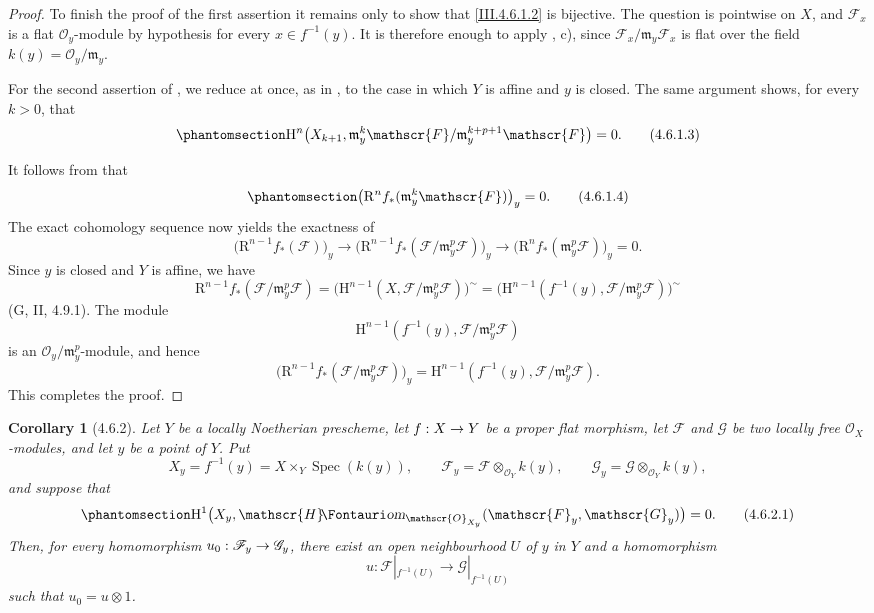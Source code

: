 \documentclass[oneside]{amsart}
\theoremstyle{ega-env-style}
\theoremstyle{ega-thm-env-style}
\newtheorem*{corollary}{Corollary}
\theoremstyle{ega-defn-env-style}
\def\mathcal{\mathscr}
\def\sh{\mathcal}                   %
\def\HH{\mathrm{H}}                 %
\def\RR{\mathrm{R}}                 %
\def\kres{k}                        %
\def\Spec{\operatorname{Spec}}
\renewcommand{\to}{\mathchoice{\longrightarrow}{\rightarrow}{\rightarrow}{\rightarrow}}
\def\shHom{\sh{H}\textup{\kern-2.2pt{\Fontauri\slshape om}}}   %
\newcommand{\oldpage}[2][]{{\marginnote{\normalfont{\textbf{#1}~|~#2}}}\ignorespaces}
\let\EGAOriginalLabel\label
\renewcommand{\label}[1]{\phantomsection\EGAOriginalLabel{#1}}
\begin{document}
\begin{proof}
To finish the proof of the first assertion it remains only to show
that \eqref{III.4.6.1.2} is bijective.  The question is pointwise on
$X$, and $\sh{F}_x$ is a flat $\sh{O}_y$-module by hypothesis for
every $x\in f^{-1}(y)$.  It is therefore enough to apply
, c), since
$\sh{F}_x/\mathfrak m_y\sh{F}_x$ is flat over the field
$\kres(y)=\sh{O}_y/\mathfrak m_y$.

For the second assertion of , we reduce at once, as
in , to the case in which $Y$ is affine and $y$ is
closed.  The same argument shows, for every $k>0$, that
\[
\label{III.4.6.1.3}
  \HH^n\bigl(X_{k+1},
    \mathfrak m_y^k\sh{F}/
      \mathfrak m_y^{k+p+1}\sh{F}\bigr)=0.
  \tag{4.6.1.3}
\]

\oldpage[III]{141}

It follows from  that
\[
\label{III.4.6.1.4}
  \bigl(\RR^n f_*(\mathfrak m_y^k\sh{F})\bigr)_y=0.
  \tag{4.6.1.4}
\]
The exact cohomology sequence now yields the exactness of
\[
  \bigl(\RR^{n-1}f_*(\sh{F})\bigr)_y
  \longrightarrow
  \bigl(\RR^{n-1}f_*
    (\sh{F}/\mathfrak m_y^p\sh{F})\bigr)_y
  \longrightarrow
  \bigl(\RR^n f_*(\mathfrak m_y^p\sh{F})\bigr)_y=0.
\]
Since $y$ is closed and $Y$ is affine, we have
\[
  \RR^{n-1}f_*(\sh{F}/\mathfrak m_y^p\sh{F})
  =
  \bigl(\HH^{n-1}
    (X,\sh{F}/\mathfrak m_y^p\sh{F})\bigr)^{\sim}
  =
  \bigl(\HH^{n-1}
    (f^{-1}(y),\sh{F}/\mathfrak m_y^p\sh{F})\bigr)^{\sim}
\]
(G, II, 4.9.1).  The module
\[
  \HH^{n-1}
    (f^{-1}(y),\sh{F}/\mathfrak m_y^p\sh{F})
\]
is an $\sh{O}_y/\mathfrak m_y^p$-module, and hence
\[
  \bigl(\RR^{n-1}f_*
    (\sh{F}/\mathfrak m_y^p\sh{F})\bigr)_y
  =
  \HH^{n-1}
    (f^{-1}(y),\sh{F}/\mathfrak m_y^p\sh{F}).
\]
This completes the proof.
\end{proof}

\begin{corollary}[4.6.2]
\label{III.4.6.2}
Let $Y$ be a locally Noetherian prescheme, let $f:X\to Y$ be a
proper flat morphism, let $\sh{F}$ and $\sh{G}$ be two locally free
$\sh{O}_X$-modules, and let $y$ be a point of $Y$.  Put
\[
  X_y=f^{-1}(y)=X\times_Y\Spec(\kres(y)),\qquad
  \sh{F}_y=\sh{F}\otimes_{\sh{O}_Y}\kres(y),\qquad
  \sh{G}_y=\sh{G}\otimes_{\sh{O}_Y}\kres(y),
\]
and suppose that
\[
\label{III.4.6.2.1}
  \HH^1\bigl(
    X_y,\shHom_{\sh{O}_{X_y}}(\sh{F}_y,\sh{G}_y)
  \bigr)=0.
  \tag{4.6.2.1}
\]
Then, for every homomorphism $u_0:\sh{F}_y\to\sh{G}_y$, there exist
an open neighbourhood $U$ of $y$ in $Y$ and a homomorphism
\[
  u:\sh{F}|_{f^{-1}(U)}\longrightarrow
    \sh{G}|_{f^{-1}(U)}
\]
such that $u_0=u\otimes1$.
\end{corollary}
\end{document}
